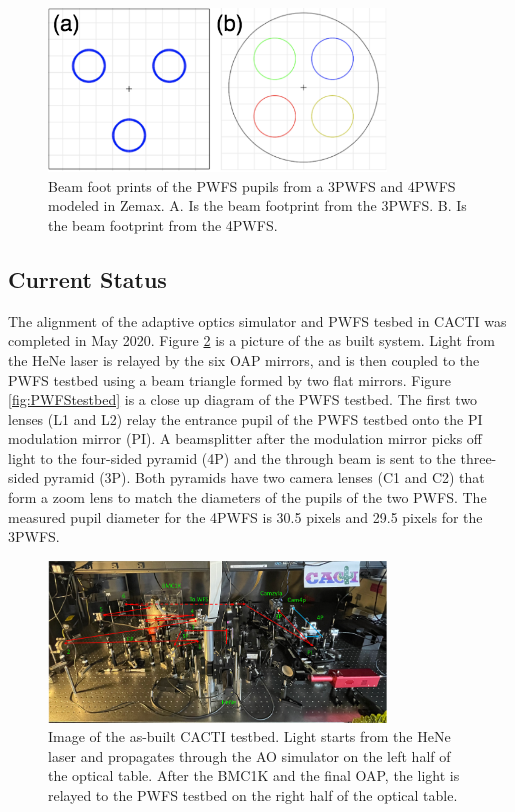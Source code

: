 \begin{figure}
    \centering
    \includegraphics[width=0.8\textwidth]{Chapter Materials/Chapter Five Materials/BeamFootPrint.png}
    \caption{Beam foot prints of the PWFS pupils from a 3PWFS and 4PWFS modeled in Zemax. A. Is the beam footprint from the 3PWFS. B. Is the beam footprint from the 4PWFS.  }
    \label{fig:beamfp}
\end{figure}


\subsection{Current Status}

The alignment of the adaptive optics simulator and PWFS tesbed in CACTI was completed in May 2020. Figure \ref{fig:cactiTestbed} is a picture of the as built system. Light from the HeNe laser is relayed by the six OAP mirrors, and is then coupled to the PWFS testbed using a beam triangle formed by two flat mirrors. Figure \ref{fig:PWFStestbed} is a close up diagram of the PWFS testbed. The first two lenses (L1 and L2) relay the entrance pupil of the PWFS testbed onto the PI modulation mirror (PI). A beamsplitter after the modulation mirror picks off light to the four-sided pyramid (4P) and the through beam is sent to the three-sided pyramid (3P). Both pyramids have two camera lenses (C1 and C2) that form a zoom lens to match the diameters of the pupils of the two PWFS. The measured pupil diameter for the 4PWFS is 30.5 pixels and 29.5 pixels for the 3PWFS. 

\begin{figure}
    \centering
    \includegraphics[width=0.8\textwidth]{Chapter Materials/Chapter Five Materials/cactiTestbed.png}
    \caption{Image of the as-built CACTI testbed. Light starts from the HeNe laser and propagates through the AO simulator on the left half of the optical table. After the BMC1K and the final OAP, the light is relayed to the PWFS testbed on the right half of the optical table.}
    \label{fig:cactiTestbed}
\end{figure}

